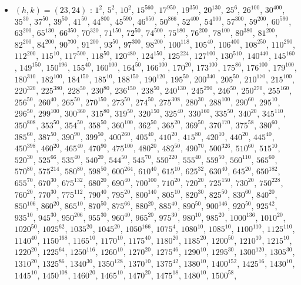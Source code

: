 \begin{itemize}
\item $(h,k)=(23,24)$ : $1^{2}$, $5^{2}$, $10^{2}$, $15^{560}$, $17^{950}$, $19^{350}$, $20^{130}$, $25^{6}$, $26^{100}$, $30^{400}$, $35^{30}$, $37^{50}$, $39^{50}$, $41^{50}$, $44^{800}$, $45^{590}$, $46^{650}$, $50^{866}$, $52^{400}$, $54^{100}$, $57^{300}$, $59^{200}$, $60^{590}$, $63^{200}$, $65^{130}$, $66^{350}$, $70^{320}$, $71^{150}$, $72^{50}$, $74^{500}$, $75^{180}$, $76^{200}$, $78^{100}$, $80^{380}$, $81^{200}$, $82^{200}$, $84^{200}$, $90^{700}$, $91^{200}$, $93^{50}$, $97^{300}$, $98^{200}$, $100^{118}$, $105^{40}$, $106^{400}$, $108^{250}$, $110^{290}$, $112^{200}$, $115^{10}$, $117^{500}$, $118^{50}$, $120^{480}$, $124^{150}$, $125^{224}$, $127^{100}$, $130^{510}$, $140^{440}$, $145^{160}$, $149^{150}$, $150^{196}$, $155^{40}$, $160^{100}$, $164^{50}$, $166^{100}$, $170^{20}$, $173^{100}$, $175^{86}$, $176^{100}$, $179^{100}$, $180^{310}$, $182^{100}$, $184^{150}$, $185^{10}$, $188^{150}$, $190^{120}$, $195^{50}$, $200^{340}$, $205^{50}$, $210^{170}$, $215^{100}$, $220^{320}$, $225^{380}$, $228^{50}$, $230^{80}$, $236^{150}$, $238^{50}$, $240^{130}$, $245^{290}$, $246^{50}$, $250^{270}$, $255^{160}$, $256^{50}$, $260^{40}$, $265^{50}$, $270^{150}$, $273^{50}$, $274^{50}$, $275^{308}$, $280^{30}$, $288^{100}$, $290^{60}$, $295^{10}$, $296^{50}$, $299^{100}$, $300^{360}$, $315^{80}$, $319^{50}$, $320^{150}$, $325^{40}$, $330^{160}$, $335^{50}$, $340^{20}$, $345^{110}$, $350^{808}$, $353^{50}$, $354^{50}$, $358^{50}$, $360^{100}$, $362^{50}$, $365^{20}$, $369^{50}$, $370^{170}$, $375^{58}$, $380^{60}$, $385^{60}$, $387^{50}$, $390^{90}$, $399^{50}$, $400^{260}$, $405^{40}$, $410^{20}$, $415^{80}$, $420^{10}$, $440^{20}$, $445^{40}$, $450^{398}$, $460^{20}$, $465^{40}$, $470^{90}$, $475^{100}$, $480^{20}$, $482^{50}$, $490^{70}$, $500^{326}$, $510^{60}$, $515^{10}$, $520^{30}$, $525^{66}$, $535^{40}$, $540^{20}$, $544^{50}$, $545^{70}$, $550^{220}$, $555^{40}$, $559^{50}$, $560^{110}$, $565^{60}$, $570^{80}$, $575^{214}$, $580^{80}$, $598^{50}$, $600^{264}$, $610^{40}$, $615^{10}$, $625^{32}$, $630^{40}$, $645^{20}$, $650^{182}$, $655^{70}$, $670^{30}$, $675^{132}$, $680^{20}$, $690^{40}$, $700^{100}$, $710^{20}$, $720^{20}$, $725^{150}$, $730^{20}$, $750^{228}$, $760^{20}$, $770^{30}$, $775^{112}$, $790^{40}$, $795^{20}$, $800^{140}$, $805^{10}$, $820^{30}$, $825^{50}$, $830^{60}$, $840^{20}$, $850^{106}$, $860^{20}$, $865^{10}$, $870^{50}$, $875^{66}$, $880^{20}$, $885^{40}$, $890^{50}$, $900^{146}$, $920^{50}$, $925^{42}$, $935^{10}$, $945^{30}$, $950^{206}$, $955^{30}$, $960^{40}$, $965^{20}$, $975^{30}$, $980^{10}$, $985^{20}$, $1000^{136}$, $1010^{20}$, $1020^{50}$, $1025^{62}$, $1035^{20}$, $1045^{20}$, $1050^{166}$, $1075^{4}$, $1080^{10}$, $1085^{10}$, $1100^{110}$, $1125^{110}$, $1140^{40}$, $1150^{168}$, $1165^{10}$, $1170^{10}$, $1175^{40}$, $1180^{20}$, $1185^{20}$, $1200^{50}$, $1210^{10}$, $1215^{10}$, $1220^{20}$, $1225^{64}$, $1250^{116}$, $1260^{10}$, $1270^{20}$, $1275^{46}$, $1290^{10}$, $1295^{30}$, $1300^{120}$, $1305^{30}$, $1310^{20}$, $1325^{86}$, $1340^{30}$, $1350^{128}$, $1370^{10}$, $1375^{42}$, $1380^{10}$, $1400^{152}$, $1425^{16}$, $1430^{10}$, $1445^{10}$, $1450^{108}$, $1460^{20}$, $1465^{10}$, $1470^{20}$, $1475^{18}$, $1480^{10}$, $1500^{58}$, 
\end{itemize}
